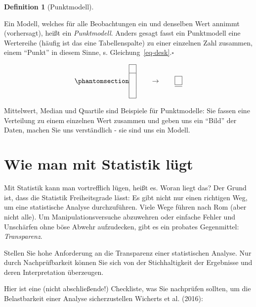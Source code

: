 \documentclass[
  letterpaper,
]{scrbook}
\theoremstyle{definition}
\theoremstyle{definition}
\newtheorem{definition}{Definition}[chapter]
\theoremstyle{definition}
\theoremstyle{remark}
\begin{document}
\begin{definition}[Punktmodell]\protect\hypertarget{def-punktmodell}{}\label{def-punktmodell}

Ein Modell, welches für alle Beobachtungen ein und denselben Wert
annimmt (vorhersagt), heißt ein \emph{Punktmodell}. Anders gesagt fasst
ein Punktmodell eine Wertereihe (häufig ist das eine Tabellenspalte) zu
einer einzelnen Zahl zusammen, einem ``Punkt'' in diesem Sinne, s.
Gleichung~\ref{eq-desk}.\(\square\)

\end{definition}

\begin{equation}\phantomsection\label{eq-desk}{\begin{array}{|c|} \hline \\ \hline \\\\\\ \hline \end{array} \qquad \rightarrow \qquad \begin{array}{|c|} \hline \\ \hline  \hline \end{array}}\end{equation}

Mittelwert, Median und Quartile sind Beispiele für Punktmodelle: Sie
fassen eine Verteilung zu einem einzelnen Wert zusammen und geben uns
ein ``Bild'' der Daten, machen Sie uns verständlich - sie sind uns ein
Modell.

\section{Wie man mit Statistik
lügt}\label{wie-man-mit-statistik-luxfcgt-2}

Mit Statistik kann man vortrefflich lügen, heißt es. Woran liegt das?
Der Grund ist, dass die Statistik Freiheitsgrade lässt: Es gibt nicht
nur einen richtigen Weg, um eine statistische Analyse durchzuführen.
Viele Wege führen nach Rom (aber nicht alle). Um Manipulationsversuche
abzuwehren oder einfache Fehler und Unschärfen ohne böse Abwehr
aufzudecken, gibt es ein probates Gegenmittel: \emph{Transparenz}.

\label{callout-important}
Stellen Sie hohe Anforderung an die Transparenz einer statistischen
Analyse. Nur durch Nachprüfbarkeit können Sie sich von der
Stichhaltigkeit der Ergebnisse und deren Interpretation überzeugen.

Hier ist eine (nicht abschließende!) Checkliste, was Sie nachprüfen
sollten, um die Belastbarkeit einer Analyse sicherzustellen Wicherts et
al. (2016):
\end{document}
